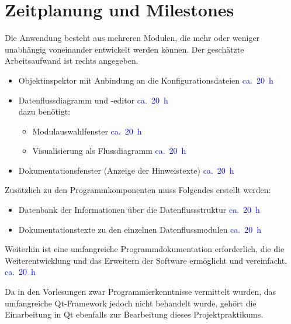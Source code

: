 \documentclass[a4paper, 11pt, fleqn, pointlessnumbers]{scrartcl}
\newcommand{\worktime}[1]{\hfill\textcolor{blue}{ca.~#1~h}}
\begin{document}
  \section{Zeitplanung und Milestones}
  Die Anwendung besteht aus mehreren Modulen, die mehr oder weniger
  unabhängig voneinander entwickelt werden können. Der geschätzte
  Arbeitsaufwand ist rechts angegeben.
  \begin{itemize}
    \item Objektinspektor mit Anbindung an die Konfigurationsdateien
      \worktime{20}
    \item Datenflussdiagramm und -editor \worktime{20}\\
      dazu benötigt:
    \begin{itemize}
      \item Modulauswahlfenster \worktime{20}
      \item Visualisierung als Flussdiagramm \worktime{20}
    \end{itemize}
    \item Dokumentationsfenster (Anzeige der Hinweistexte) \worktime{20}
  \end{itemize}

  Zusätzlich zu den Programmkomponenten muss Folgendes erstellt werden:
  \begin{itemize}
    \item Datenbank der Informationen über die Datenflussstruktur
      \worktime{20}
    \item Dokumentationstexte zu den einzelnen Datenflussmodulen
      \worktime{20}
  \end{itemize}

  Weiterhin ist eine umfangreiche Programmdokumentation erforderlich,
  die die Weiterentwicklung und das Erweitern der Software ermöglicht und
  vereinfacht. \worktime{20}

  \vspace{5mm}
  Da in den Vorlesungen zwar Programmierkenntnisse vermittelt wurden,
  das umfangreiche Qt-Framework jedoch nicht behandelt wurde, gehört
  die Einarbeitung in Qt ebenfalls zur Bearbeitung dieses Projektpraktikums.
\end{document}
